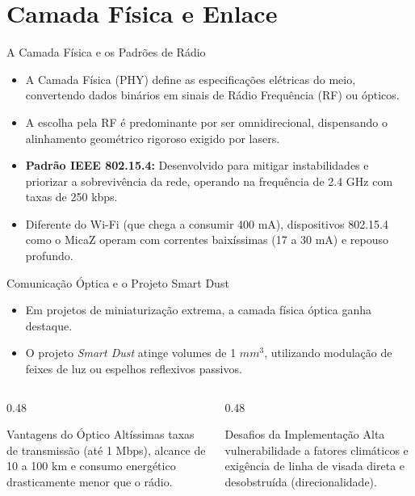\section{Camada Física e Enlace}

\begin{frame}{A Camada Física e os Padrões de Rádio}
    \begin{itemize}
        \item A Camada Física (PHY) define as especificações elétricas do meio, convertendo dados binários em sinais de Rádio Frequência (RF) ou ópticos.   
        \item A escolha pela RF é predominante por ser omnidirecional, dispensando o alinhamento geométrico rigoroso exigido por lasers.   
        \item \textbf{  Padrão IEEE 802.15.4:} Desenvolvido para mitigar instabilidades e priorizar a sobrevivência da rede, operando na frequência de 2.4 GHz com taxas de 250 kbps.   
        \item Diferente do Wi-Fi (que chega a consumir 400 mA), dispositivos 802.15.4 como o MicaZ operam com correntes baixíssimas (17 a 30 mA) e repouso profundo.   
    \end{itemize}
\end{frame}

\begin{frame}{Comunicação Óptica e o Projeto Smart Dust}
    \begin{itemize}
        \item Em projetos de miniaturização extrema, a camada física óptica ganha destaque.   
        \item O projeto \textit{Smart Dust} atinge volumes de 1 $mm^3$, utilizando modulação de feixes de luz ou espelhos reflexivos passivos.   
    \end{itemize}
    
    \vspace{0.4cm}
    
    \begin{columns}
        \begin{column}{0.48\textwidth}
            \begin{block}{Vantagens do Óptico}
                Altíssimas taxas de transmissão (até 1 Mbps), alcance de 10 a 100 km e consumo energético drasticamente menor que o rádio.   
            \end{block}
        \end{column}
        
        \begin{column}{0.48\textwidth}
            \begin{alertblock}{Desafios da Implementação}
                Alta vulnerabilidade a fatores climáticos e exigência de linha de visada direta e desobstruída (direcionalidade).   
            \end{alertblock}
        \end{column}
    \end{columns}
\end{frame}

